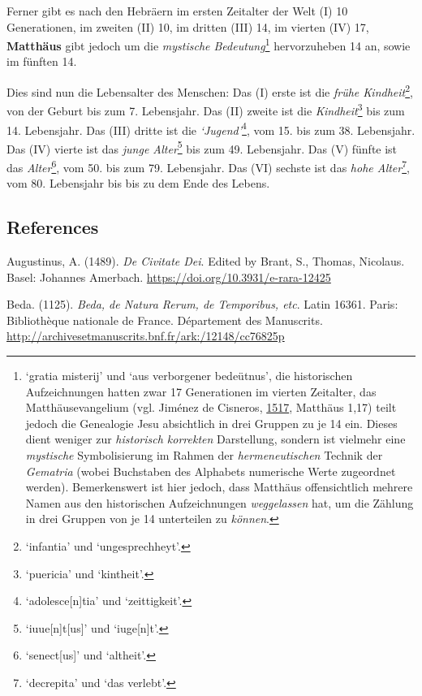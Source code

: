 \documentclass[
]{article}
\begin{document}
Ferner gibt es nach den Hebräern im ersten Zeitalter der Welt (I) 10
Generationen, im zweiten (II) 10, im dritten (III) 14, im vierten (IV)
17, \textbf{Matthäus} gibt jedoch um die \emph{mystische
Bedeutung}\footnote{`gratia misterij' und `aus verborgener bedeütnus',
  die historischen Aufzeichnungen hatten zwar 17 Generationen im vierten
  Zeitalter, das Matthäusevangelium (vgl. Jiménez de Cisneros,
  \href{https://doi.org/10.3931/e-rara-46695}{1517}, Matthäus 1,17)
  teilt jedoch die Genealogie Jesu absichtlich in drei Gruppen zu je 14
  ein. Dieses dient weniger zur \emph{historisch korrekten} Darstellung,
  sondern ist vielmehr eine \emph{mystische} Symbolisierung im Rahmen
  der \emph{hermeneutischen} Technik der \emph{Gematria} (wobei
  Buchstaben des Alphabets numerische Werte zugeordnet werden).
  Bemerkenswert ist hier jedoch, dass Matthäus offensichtlich mehrere
  Namen aus den historischen Aufzeichnungen \emph{weggelassen} hat, um
  die Zählung in drei Gruppen von je 14 unterteilen zu \emph{können}.}
hervorzuheben 14 an, sowie im fünften 14.

Dies sind nun die Lebensalter des Menschen: Das (I) erste ist die
\emph{frühe Kindheit}\footnote{`infantia' und `ungesprechheyt'.}, von
der Geburt bis zum 7. Lebensjahr. Das (II) zweite ist die
\emph{Kindheit}\footnote{`puericia' und `kintheit'.} bis zum 14.
Lebensjahr. Das (III) dritte ist die \emph{`Jugend'}\footnote{`adolesce{[}n{]}tia'
  und `zeittigkeit'.}, vom 15. bis zum 38. Lebensjahr. Das (IV) vierte
ist das \emph{junge Alter}\footnote{`iuue{[}n{]}t{[}us{]}' und
  `iuge{[}n{]}t'.} bis zum 49. Lebensjahr. Das (V) fünfte ist das
\emph{Alter}\footnote{`senect{[}us{]}' und `altheit'.}, vom 50. bis zum
79. Lebensjahr. Das (VI) sechste ist das \emph{hohe Alter}\footnote{`decrepita'
  und `das verlebt'.}, vom 80. Lebensjahr bis bis zu dem Ende des
Lebens.

\hypertarget{references}{%
\subsection{References}\label{references}}

Augustinus, A. (1489). \emph{De Civitate Dei}. Edited by Brant, S.,
Thomas, Nicolaus. Basel: Johannes Amerbach.
\url{https://doi.org/10.3931/e-rara-12425}

Beda. (1125). \emph{Beda, de Natura Rerum, de Temporibus, etc}. Latin
16361. Paris: Bibliothèque nationale de France. Département des
Manuscrits. \url{http://archivesetmanuscrits.bnf.fr/ark:/12148/cc76825p}
\end{document}
